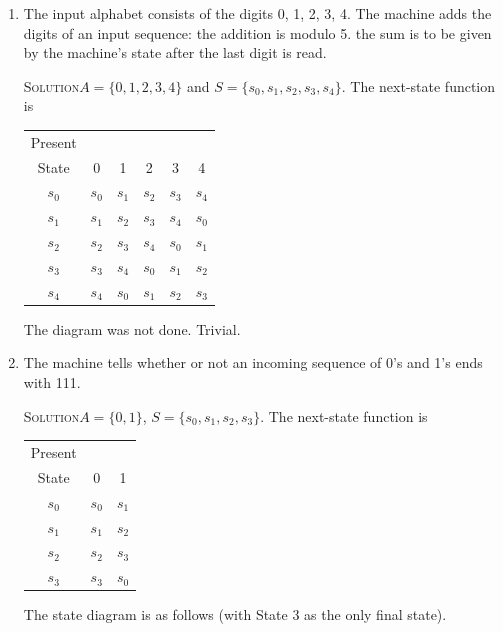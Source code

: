 \documentclass[twoside]{amsart}
\newcommand{\solution}{\textsc{Solution}\xspace}
\begin{document}
\begin{enumerate}[A.]
\begin{enumerate}[1]
      \item The input alphabet consists of the digits 0, 1, 2, 3, 4.
      The machine adds the digits of an input sequence: the addition
      is modulo 5. the sum is to be given by the machine's state
      after the last digit is read.

      \vspace{5pt}
      \noindent \solution $A=\{0,1,2,3,4\}$ and $S=\{s_0,s_1,s_2,s_3,s_4\}$.
      The next-state function is
      \vspace{5pt}
      \begin{center}
         \begin{tabular}{c|ccccc}
	    Present & \\
	    State &   0   &   1   &   2   &   3   &   4   \\ \hline
	    $s_0$ & $s_0$ & $s_1$ & $s_2$ & $s_3$ & $s_4$ \\
	    $s_1$ & $s_1$ & $s_2$ & $s_3$ & $s_4$ & $s_0$ \\
	    $s_2$ & $s_2$ & $s_3$ & $s_4$ & $s_0$ & $s_1$ \\
	    $s_3$ & $s_3$ & $s_4$ & $s_0$ & $s_1$ & $s_2$ \\
	    $s_4$ & $s_4$ & $s_0$ & $s_1$ & $s_2$ & $s_3$
	 \end{tabular}
      \end{center}
      \vspace{5pt}

      The diagram was not done. Trivial.

      \item The machine tells whether or not an incoming sequence of
      0's and 1's ends with 111.

      \noindent \solution $A=\{0,1\}$, $S=\{s_0,s_1,s_2,s_3\}$.
      The next-state function is
      \vspace{5pt}
      \begin{center}
         \begin{tabular}{c|cc}
	    Present & \\
	    State &   0   &   1   \\ \hline
	    $s_0$ & $s_0$ & $s_1$ \\
	    $s_1$ & $s_1$ & $s_2$ \\
	    $s_2$ & $s_2$ & $s_3$ \\
	    $s_3$ & $s_3$ & $s_0$ 
	 \end{tabular}
      \end{center}
      \vspace{5pt}
      The state diagram is as follows (with State 3 as the only final
      state).
      \begin{center}
      \end{center}


\end{enumerate}
\end{enumerate}
\end{document}
